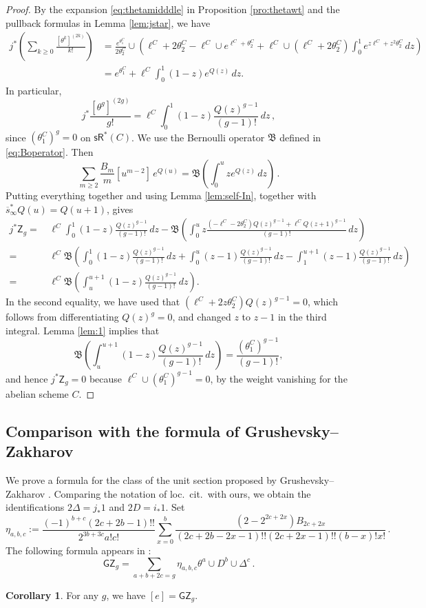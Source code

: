 \documentclass[11pt]{article}
\def\sR{\mathsf{sR}}
\newcommand{\fB}{\mathfrak{B}}
\newcommand{\sbar}{\overline{s}}
\theoremstyle{definition}
\newtheorem{corollary}[definition]{Corollary}
\begin{document}
\begin{proof}
    By the expansion \eqref{eq:thetamidddle} in Proposition \ref{pro:thetawt} and the pullback formulas in Lemma \ref{lem:jstar}, we have
    \begin{align*}
        j^*\left(\sum_{k\geq0}\frac{[\theta^k]^{(2k)}}{k!}\right)
        &=
        \frac{e^{\theta_1^C}}{2\theta_2^C}\cup
        \left(
        \ell^C+2\theta_2^C
        -\ell^C\cup e^{\ell^C+\theta_2^C}
        +\ell^C\cup(\ell^C+2\theta_2^C)
        \int_0^1e^{z\ell^C+z^2\theta_2^C}\,dz
        \right)\\
        &=
        e^{\theta_1^C}
        +\ell^C\int_0^1(1-z)e^{Q(z)}\,dz.
    \end{align*}
    In particular,
    \[
        j^* \frac{[\theta^g]^{(2g)}}{g!}
        =
        \ell^C\int_0^1(1-z)
        \frac{Q(z)^{g-1}}{(g-1)!}\,dz\, ,
    \]
    since $(\theta_1^C)^g=0$ on $\sR^*(C)$. We use the Bernoulli operator $\fB$ defined in \eqref{eq:Boperator}. Then
    \[
        \sum_{m\geq2}\frac{B_m}{m}[u^{m-2}]\,e^{Q(u)}
        =
        \fB\left(\int_0^u z e^{Q(z)}\,dz\right)\, .
    \]
    Putting everything together and using Lemma \ref{lem:self-In}, together with
    $\sbar_{\infty}^*Q(u)=Q(u+1)$, gives
    \begin{align*}
    j^* \mathsf{Z}_g =&\,\ell^C \int_0^1(1-z)\frac{Q(z)^{g-1}}{(g-1)!}\, dz - \fB \left(\int_0^u
        z\frac{(-\ell^C-2\theta_2^C)Q(z)^{g-1}
        +\ell^C Q(z+1)^{g-1}}{(g-1)!}\,dz\right)\\
        =&\, \ell^C\fB \left(\int_0^1(1-z)\frac{Q(z)^{g-1}}{(g-1)!}\, dz + \int_0^u(z-1)\frac{Q(z)^{g-1}}{(g-1)!}\, dz - \int_1^{u+1}(z-1)\frac{Q(z)^{g-1}}{(g-1)!}\, dz\right)\\
        =&\, \ell^C\fB \left(\int_{u}^{u+1}(1-z)\frac{Q(z)^{g-1}}{(g-1)!}\, dz\right).
    \end{align*}
    In the second equality, we have used that $(\ell^C+2z\theta_2^C)Q(z)^{g-1}=0$, which follows from differentiating $Q(z)^g=0$, and changed $z$ to $z-1$ in the third integral. Lemma \ref{lem:1} implies that
    $$
    \fB \left(\int_{u}^{u+1}(1-z)\frac{Q(z)^{g-1}}{(g-1)!}\, dz\right) = \frac{(\theta_1^C)^{g-1}}{(g-1)!},
    $$
    and hence $j^* \mathsf{Z}_g=0$ because $\ell^C \cup (\theta_1^C)^{g-1} =0$, by the weight vanishing for the abelian scheme $C$.
\end{proof}

\subsection{Comparison with the formula of Grushevsky--Zakharov}\label{sec:gz}
We prove a formula for the class of the unit section proposed by Grushevsky--Zakharov \cite{GZ}. Comparing the notation of loc.\ cit.\ with ours, we obtain the identifications $2\Delta = j_*1$ and $2D = i_*1$. Set
\[
\eta_{a,b,c} := \frac{(-1)^{b+c}(2c+2b-1)!!}{2^{3b+3c}a!c!} \sum_{x=0}^b \frac{(2-2^{2c+2x})B_{2c+2x}}{(2c+2b-2x-1)!! (2c+2x-1)!!(b-x)! x!}\,.
\]
The following formula appears in \cite[Remark 1.2]{GZ}:
\[
\mathsf{GZ}_g
= \sum_{a+b+2c=g} \eta_{a,b,c}\theta^a \cup D^b \cup \Delta^c\,.
\]
\begin{corollary}\label{cor:gz=s}
    For any $g$, we have $[e] = \mathsf{GZ}_g$.
\end{corollary}
\end{document}
